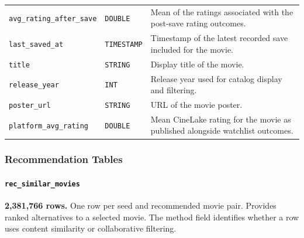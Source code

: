 \documentclass[a4paper,12pt]{article}
\newcommand{\dbsep}{\_\allowbreak}
\begin{document}
\begin{longtable}{@{}>{\raggedright\arraybackslash}p{}
                    >{\raggedright\arraybackslash}p{}
                    >{\raggedright\arraybackslash}p{}@{}}
\texttt{avg\dbsep rating\dbsep after\dbsep save} & \texttt{DOUBLE} & Mean of the ratings associated with the post-save rating outcomes.\\
\texttt{last\dbsep saved\dbsep at} & \texttt{TIMESTAMP} & Timestamp of the latest recorded save included for the movie.\\
\texttt{title} & \texttt{STRING} & Display title of the movie.\\
\texttt{release\dbsep year} & \texttt{INT} & Release year used for catalog display and filtering.\\
\texttt{poster\dbsep url} & \texttt{STRING} & URL of the movie poster.\\
\texttt{platform\dbsep avg\dbsep rating} & \texttt{DOUBLE} & Mean CineLake rating for the movie as published alongside watchlist outcomes.\\
\end{longtable}
\endgroup

\subsubsection{Recommendation Tables}

\paragraph{\texttt{rec\dbsep similar\dbsep movies}}
\textbf{2,381,766 rows.} One row per seed and recommended movie pair.
Provides ranked alternatives to a selected movie. The method field identifies whether a row uses content similarity or collaborative filtering.
\end{document}
